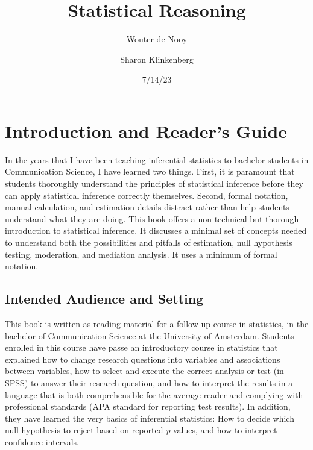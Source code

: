 \documentclass[
  letterpaper,
  DIV=11,
  numbers=noendperiod]{scrreprt}
\title{Statistical Reasoning}
\author{Wouter de Nooy \and Sharon Klinkenberg}
\date{7/14/23}
\renewcommand*\contentsname{Table of contents}
\newcommand\contentsname{Table of contents}
\begin{document}
\maketitle
\ifdefined\Shaded\renewenvironment{Shaded}{\begin{tcolorbox}[boxrule=0pt, borderline west={3pt}{0pt}{shadecolor}, breakable, enhanced, interior hidden, frame hidden, sharp corners]}{\end{tcolorbox}}\fi

\renewcommand*\contentsname{Table of contents}
{
\hypersetup{linkcolor=}
\setcounter{tocdepth}{2}
\tableofcontents
}

\hypertarget{introduction-and-readers-guide}{%
\chapter*{Introduction and Reader's
Guide}\label{introduction-and-readers-guide}}


In the years that I have been teaching inferential statistics to
bachelor students in Communication Science, I have learned two things.
First, it is paramount that students thoroughly understand the
principles of statistical inference before they can apply statistical
inference correctly themselves. Second, formal notation, manual
calculation, and estimation details distract rather than help students
understand what they are doing. This book offers a non-technical but
thorough introduction to statistical inference. It discusses a minimal
set of concepts needed to understand both the possibilities and pitfalls
of estimation, null hypothesis testing, moderation, and mediation
analysis. It uses a minimum of formal notation.

\hypertarget{intended-audience-and-setting}{%
\section*{Intended Audience and
Setting}\label{intended-audience-and-setting}}


This book is written as reading material for a follow-up course in
statistics, in the bachelor of Communication Science at the University
of Amsterdam. Students enrolled in this course have passe an
introductory course in statistics that explained how to change research
questions into variables and associations between variables, how to
select and execute the correct analysis or test (in SPSS) to answer
their research question, and how to interpret the results in a language
that is both comprehensible for the average reader and complying with
professional standards (APA standard for reporting test results). In
addition, they have learned the very basics of inferential statistics:
How to decide which null hypothesis to reject based on reported \emph{p}
values, and how to interpret confidence intervals.
\end{document}
